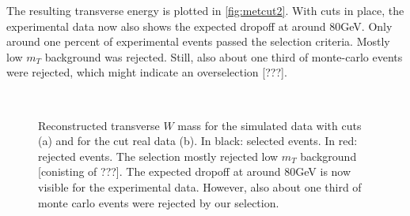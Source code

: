 \documentclass[twoside,        %
               BCOR12mm,       %
               ngerman,english, %
               fleqn,headsepline=false,footsepline=false
              ]{Vorlage/MFPREPORT}
\begin{document}
The resulting transverse energy is plotted in \cref{fig:metcut2}.
With cuts in place, the experimental data now also shows the expected dropoff
at around $80$\;GeV. Only around one percent of experimental events passed the
selection criteria. Mostly low $m_T$ background was rejected. Still, also about
one third of monte-carlo events were rejected, which might indicate an
overselection [???].

\begin{figure}
     \begin{center}
         \\ %
    \end{center}
    \caption{Reconstructed transverse $W$ mass for the simulated data with cuts
    (a) and for the cut real data (b). In black: selected events. In red:
    rejected events. The selection mostly rejected low $m_T$ background
    [conisting of ???]. The expected dropoff at around $80$\;GeV is now visible
    for the experimental data. However, also about one third of monte carlo
    events were rejected by our selection.}
\end{figure}
\end{document}

